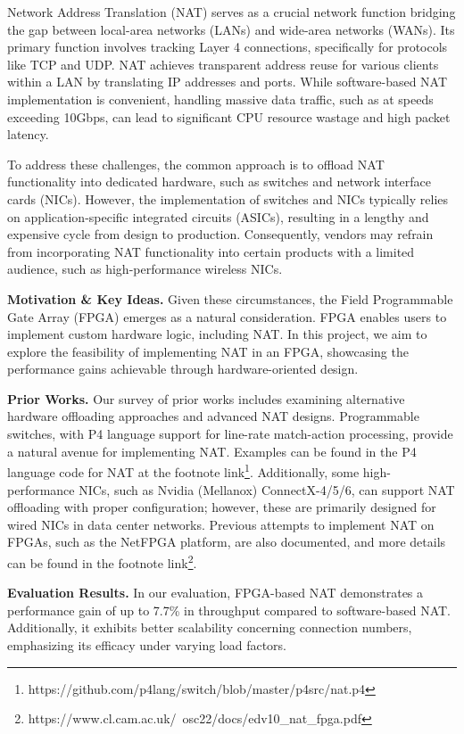 Network Address Translation (NAT) serves as a crucial network function bridging the gap between local-area networks (LANs) and wide-area networks (WANs). Its primary function involves tracking Layer 4 connections, specifically for protocols like TCP and UDP. NAT achieves transparent address reuse for various clients within a LAN by translating IP addresses and ports. While software-based NAT implementation is convenient, handling massive data traffic, such as at speeds exceeding 10Gbps, can lead to significant CPU resource wastage and high packet latency.

To address these challenges, the common approach is to offload NAT functionality into dedicated hardware, such as switches and network interface cards (NICs). However, the implementation of switches and NICs typically relies on application-specific integrated circuits (ASICs), resulting in a lengthy and expensive cycle from design to production. Consequently, vendors may refrain from incorporating NAT functionality into certain products with a limited audience, such as high-performance wireless NICs.

\textbf{Motivation \& Key Ideas.}
Given these circumstances, the Field Programmable Gate Array (FPGA) emerges as a natural consideration. FPGA enables users to implement custom hardware logic, including NAT. In this project, we aim to explore the feasibility of implementing NAT in an FPGA, showcasing the performance gains achievable through hardware-oriented design.

\textbf{Prior Works.}
Our survey of prior works includes examining alternative hardware offloading approaches and advanced NAT designs. Programmable switches, with P4 language support for line-rate match-action processing, provide a natural avenue for implementing NAT. Examples can be found in the P4 language code for NAT at the footnote link\footnote{https://github.com/p4lang/switch/blob/master/p4src/nat.p4}. Additionally, some high-performance NICs, such as Nvidia (Mellanox) ConnectX-4/5/6, can support NAT offloading with proper configuration; however, these are primarily designed for wired NICs in data center networks. Previous attempts to implement NAT on FPGAs, such as the NetFPGA platform, are also documented, and more details can be found in the footnote link\footnote{https://www.cl.cam.ac.uk/~osc22/docs/edv10\_nat\_fpga.pdf}.

\textbf{Evaluation Results.}
In our evaluation, FPGA-based NAT demonstrates a performance gain of up to 7.7\% in throughput compared to software-based NAT. Additionally, it exhibits better scalability concerning connection numbers, emphasizing its efficacy under varying load factors.

